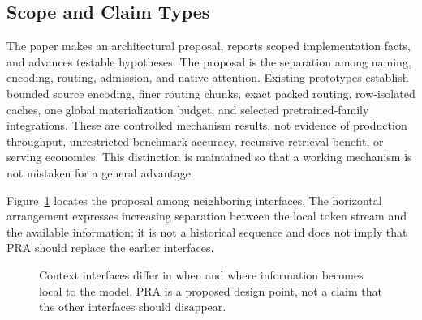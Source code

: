 \documentclass[11pt]{article}
\begin{document}
\subsection{Scope and Claim Types}

The paper makes an architectural proposal, reports scoped implementation facts, and
advances testable hypotheses.  The proposal is the separation among naming, encoding,
routing, admission, and native attention.  Existing prototypes establish bounded source
encoding, finer routing chunks, exact packed routing, row-isolated caches, one global
materialization budget, and selected pretrained-family integrations.  These are controlled
mechanism results, not evidence of production throughput, unrestricted benchmark accuracy,
recursive retrieval benefit, or serving economics.  This distinction is maintained so
that a working mechanism is not mistaken for a general advantage.

Figure~\ref{fig:evolution} locates the proposal among neighboring interfaces.  The
horizontal arrangement expresses increasing separation between the local token stream
and the available information; it is not a historical sequence and does not imply that
PRA should replace the earlier interfaces.

\begin{figure}[t]
\centering
{}
\caption{Context interfaces differ in when and where information becomes local to the model.  PRA is a proposed design point, not a claim that the other interfaces should disappear.}
\label{fig:evolution}
\end{figure}
\end{document}
